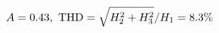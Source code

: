 \documentclass[preview]{standalone}
\begin{document}
\begin{align*}
\special{dvisvgm:raw <g id='unique000'>}A=0.43,\ \text{THD}=\sqrt{H_2^2+H_3^2}/H_1=8.3\%\special{dvisvgm:raw </g>}
\end{align*}
\end{document}
